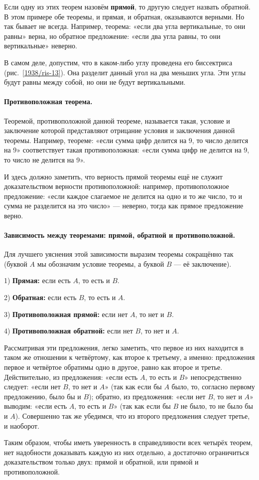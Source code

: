 \medskip

Если одну из этих теорем назовём \textbf{прямой}, то другую следует назвать обратной.
В этом примере обе теоремы, и прямая, и обратная, оказываются верными.
Но так бывает не всегда.
Например, теорема:
«если два угла вертикальные, то они равны» верна, но обратное предложение:
«если два угла равны, то они вертикальные» неверно.

В самом деле, допустим, что в каком-либо углу проведена его биссектриса (рис.~\ref{1938/ris-13}).
Она разделит данный угол на два меньших угла.
Эти углы будут равны между собой, но они не будут вертикальными.

{\sloppy

\paragraph{Противоположная теорема.}\label{1938/31}
Теоремой, противоположной данной теореме, называется такая, условие и заключение которой представляют отрицание условия и заключения данной теоремы.
Например, теореме:
«если сумма цифр делится на 9, то число делится на 9» соответствует такая противоположная:
«если сумма цифр не делится на 9, то число не делится на 9».

}

И здесь должно заметить, что верность прямой теоремы ещё не служит доказательством верности противоположной:
например, противоположное предложение:
«если каждое слагаемое не делится на одно и то же число, то и сумма не разделится на это число» — неверно, тогда как прямое предложение верно.

\paragraph{Зависимость между теоремами: прямой, обратной и противоположной.}\label{1938/32}
Для лучшего уяснения этой зависимости выразим теоремы сокращённо так (буквой $A$ мы обозначим условие теоремы, а буквой $B$ — её заключение).

1) \textbf{Прямая:}
если есть $A$, то есть и $B$.

2) \textbf{Обратная:}
если есть $B$, то есть и $A$.

3) \textbf{Противоположная прямой:}
если нет $A$, то нет и $B$.

4) \textbf{Противоположная обратной:}
если нет $B$, то нет и $A$.

Рассматривая эти предложения, легко заметить, что первое из них находится в таком же отношении к четвёртому, как второе к третьему, а именно:
предложения первое и четвёртое обратимы одно в другое, равно как второе и третье.
Действительно, из предложения:
«если есть $A$, то есть и $B$» непосредственно следует:
«если нет $B$, то нет и $A$» (так как если бы $A$ было, то, согласно первому предложению, было бы и $B$);
обратно, из предложения:
«если нет $B$, то нет и $A$» выводим:
«если есть $A$, то есть и $B$» (так как если бы $B$ не было, то не было бы и $A$).
Совершенно так же убедимся, что из второго предложения следует третье, и наоборот.

Таким образом, чтобы иметь уверенность в справедливости всех четырёх теорем, нет надобности доказывать каждую из них отдельно, а достаточно ограничиться доказательством только двух:
прямой и обратной, или прямой и противоположной.
